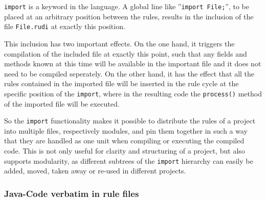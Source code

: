 %
\texttt{import} is a keyword in the \vonda language. A global line like ''\texttt{import File;}'', to be placed at an arbitrary position between the rules, results in the inclusion of the file \texttt{File.rudi} at exactly this position.

This inclusion has two important effects. On the one hand, it triggers the compilation of the included file at exactly this point, such that any fields and methods known at this time will be available in the important file and it does not need to be compiled seperately. On the other hand, it has the effect that all the rules contained in the imported file will be inserted in the rule cycle at the specific position of the \texttt{import}, where in the resulting code the \texttt{process()} method of the imported file will be executed.


So the \texttt{import} functionality makes it possible to distribute the rules of a project into multiple files, respectively modules, and pin them together in such a way that they are handled as one unit when compiling or executing the compiled code. This is not only useful for clarity and structuring of a project, but also supports modularity, as different subtrees of the \texttt{import} hierarchy can easily be added, moved, taken away or re-used in different projects.

\subsubsection{Java-Code verbatim in rule files} \label{sec:rudi-verbatim}


